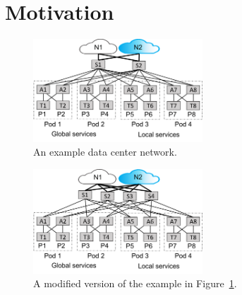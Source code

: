 \documentclass[numbers, 10pt, preprint]{sigplanconf}
\begin{document}




\section{Motivation}
\label{sec:motivation}


\begin{figure}[t!]
  \centering
  \includegraphics[width=2.5in]{figures/example}
  \caption{An example data center network.}
  \label{fig:example}
  \vspace{-1em}
\end{figure}

\begin{figure}[t!]
  \centering
  \includegraphics[width=2.5in]{figures/example2}
  \caption{A modified version of the example in Figure~\ref{fig:example}.}
  \label{fig:example2}
  \vspace{-1em}
\end{figure}
\end{document}
